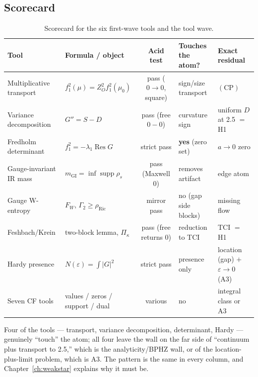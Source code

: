 \subsection{Scorecard}

\begin{table}[t]
\centering
\footnotesize
\begin{tabularx}{\textwidth}{@{}>{\raggedright\arraybackslash}p{3.0cm}
  >{\raggedright\arraybackslash}p{2.9cm}c
  >{\raggedright\arraybackslash}p{2.6cm}
  >{\raggedright\arraybackslash}X@{}}
\toprule
\textbf{Tool} & \textbf{Formula / object} & \textbf{Acid test} & \textbf{Touches the atom?} &
\textbf{Exact residual}\\
\midrule
Multiplicative transport & $f_1^2(\mu)=Z_O^2f_1^2(\mu_0)$ & pass ($0\to0$, square) &
  sign/size transport & $(\mathrm{CP})$\\
Variance decomposition & $G''=S-D$ & pass (free $0-0$) & curvature sign &
  uniform $D$ at 2.5 $=$ H1\\
Fredholm determinant & $f_1^2=-\lambda_1\operatorname{Res}G$ & strict pass &
  \textbf{yes} (zero set) & $a\to0$ zero\\
Gauge-invariant IR mass & $m_{\mathrm{GI}}=\inf\operatorname{supp}\rho_s$ &
  pass (Maxwell 0) & removes artifact & edge atom\\
Gauge W-entropy & $F_W$, $\Gamma_2\ge\rho_{\mathrm{Ric}}$ & mirror pass & no (gap side blocks) &
  missing flow\\
Feshbach/Krein & two-block lemma, $\Pi_\kappa$ & pass (free returns 0) &
  reduction to TCI & TCI $=$ H1\\
Hardy presence & $N(\varepsilon)=\int|G|^2$ & strict pass & presence only &
  location (gap) $+$ $\varepsilon\to0$ (A3)\\
Seven CF tools & values / zeros / support / dual & various & no & integral class or A3\\
\bottomrule
\end{tabularx}
\caption{Scorecard for the six first-wave tools and the tool wave.}
\label{tab:tools}
\end{table}

Four of the tools --- transport, variance decomposition, determinant, Hardy --- genuinely
``touch'' the atom; all four leave the wall on the far side of ``continuum plus transport to
2.5,'' which is the analyticity/BPHZ wall, or of the location-plus-limit problem, which is A3.
The pattern is the same in every column, and Chapter~\ref{ch:weakstar} explains why it must be.

